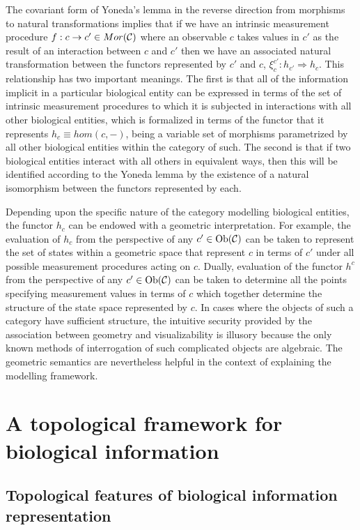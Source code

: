 \documentclass[aps,twocolumn]{revtex4-1}
\begin{document}
The covariant form of Yoneda's lemma in the reverse direction from morphisms to natural transformations implies that if we have an intrinsic measurement procedure $f:c \rightarrow c' \in Mor({\mathcal C})$  where an observable $c$ takes values in $c'$ as the result of an interaction between $c$ and $c'$ then we have an associated natural transformation between the functors represented by $c'$ and $c$, $\xi^{c'}_{c} : h_{c'} \Rightarrow h_c$. 
This relationship has two important meanings. The first is that all of the information implicit in a particular biological entity can be expressed in terms of the set of intrinsic measurement procedures to which it is subjected in interactions with all other biological entities, which is formalized in terms of the functor that it represents $h_c \equiv hom(c,-)$, being a variable set of morphisms parametrized by all other biological entities within the category of such. The second is that if two biological entities interact with all others in equivalent ways, then this will be identified according to the Yoneda lemma by the existence of a natural isomorphism between the functors represented by each.

Depending upon the specific nature of the category modelling biological entities, the functor $h_c$ can be endowed with a geometric interpretation. For example, the evaluation of $h_c$ from the perspective of any $c' \in \mathop{\rm Ob}\nolimits({\mathcal C})$ can be taken to represent the set of states within a geometric space that represent $c$ in terms of $c'$ under all possible measurement procedures acting on $c$. Dually, evaluation of the functor $h^c$ from the perspective of any $c' \in \mathop{\rm Ob}\nolimits({\mathcal C})$ can be taken to determine all the points specifying measurement values in terms of $c$ which together determine the structure of the state space represented by $c$. In cases where the objects of such a category have sufficient structure, the intuitive security provided by the association between geometry and visualizability is illusory because the only known methods of interrogation of such complicated objects are algebraic. The geometric semantics are nevertheless helpful in the context of explaining the modelling framework.

\section{A topological framework for biological information}

\subsection{Topological features of biological information representation}
\end{document}

